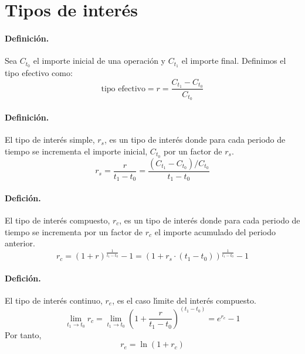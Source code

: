 
\section{Tipos de inter\'es}
\label{sec:interests}

\paragraph{Definici\'on.}
Sea $C_{t_0}$ el importe inicial de una operaci\'on y $C_{t_1}$ el importe final. 
Definimos el tipo efectivo como:
\begin{equation}
\label{tipus_efectiu}
\textrm{tipo efectivo} = r = \frac{C_{t_1}-C_{t_0}}{C_{t_0}}
\end{equation}

\paragraph{Definici\'on.}
El tipo de inter\'es simple, $r_s$, es un tipo de inter\'es donde para cada 
periodo de tiempo se incrementa el importe inicial, $C_{t_0}$ por un factor de $r_s$. 
\begin{equation}
\label{interes_simple_1}
r_s = \frac{r}{t_1 - t_0} = \frac{ ( C_{t_1}-C_{t_0} ) / C_{t_0} }{t_1 - t_0}
\end{equation}

\paragraph{Defici\'on.}
El tipo de inter\'es compuesto, $r_c$, es un tipo de inter\'es donde para cada 
periodo de tiempo se incrementa por un factor de $r_c$ el importe acumulado del 
periodo anterior.
\begin{equation}
\label{interes_compuesto_1}
r_c = (1 + r) ^ \frac{1}{t_1-t_0} - 1 = (1 + r_s \cdot (t_1 - t_0)) ^ \frac{1}{t_1-t_0} - 1
\end{equation}

\paragraph{Defici\'on.}
El tipo de inter\'es continuo, $r_e$, es el caso l\'\i mite del inter\'es 
compuesto.
\begin{equation}
\label{interes_continuo_1}
\lim_{t_1 \rightarrow t_0} r_c = \lim_{t_1 \rightarrow t_0} (1 + \frac{r}{t_1-t_0}) ^ {(t_1 - t_0)} = e^{r_e} - 1
\end{equation}
Por tanto,
\begin{equation}
\label{interes_continuo_2}
r_e = \ln(1 + r_c)
\end{equation}

